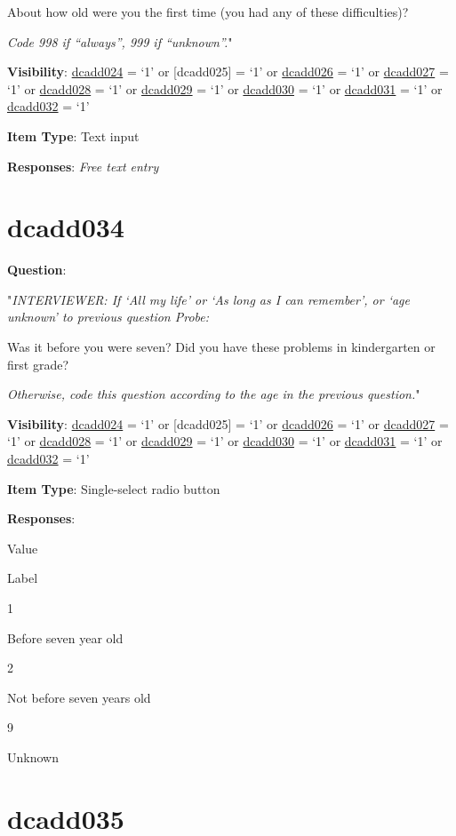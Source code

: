 \documentclass[]{book}
\begin{document}
About how old were you the first time (you had any of these difficulties)?

\emph{Code 998 if ``always'', 999 if ``unknown''.}"

\textbf{Visibility}: \protect\hyperlink{dcadd024}{dcadd024} = `1' or {[}dcadd025{]} = `1' or \protect\hyperlink{dcadd026}{dcadd026} = `1' or \protect\hyperlink{dcadd027}{dcadd027} = `1' or \protect\hyperlink{dcadd028}{dcadd028} = `1' or \protect\hyperlink{dcadd029}{dcadd029} = `1' or \protect\hyperlink{dcadd030}{dcadd030} = `1' or \protect\hyperlink{dcadd031}{dcadd031} = `1' or \protect\hyperlink{dcadd032}{dcadd032} = `1'

\textbf{Item Type}: Text input

\textbf{Responses}: \emph{Free text entry}

\hypertarget{dcadd034}{%
\section{dcadd034}\label{dcadd034}}

\textbf{Question}:

"\emph{INTERVIEWER: If `All my life' or `As long as I can remember', or `age unknown' to previous question Probe:}

Was it before you were seven? Did you have these problems in kindergarten or first grade?

\emph{Otherwise, code this question according to the age in the previous question.}"

\textbf{Visibility}: \protect\hyperlink{dcadd024}{dcadd024} = `1' or {[}dcadd025{]} = `1' or \protect\hyperlink{dcadd026}{dcadd026} = `1' or \protect\hyperlink{dcadd027}{dcadd027} = `1' or \protect\hyperlink{dcadd028}{dcadd028} = `1' or \protect\hyperlink{dcadd029}{dcadd029} = `1' or \protect\hyperlink{dcadd030}{dcadd030} = `1' or \protect\hyperlink{dcadd031}{dcadd031} = `1' or \protect\hyperlink{dcadd032}{dcadd032} = `1'

\textbf{Item Type}: Single-select radio button

\textbf{Responses}:

Value

Label

1

Before seven year old

2

Not before seven years old

9

Unknown

\hypertarget{dcadd035}{%
\section{dcadd035}\label{dcadd035}}
\end{document}
